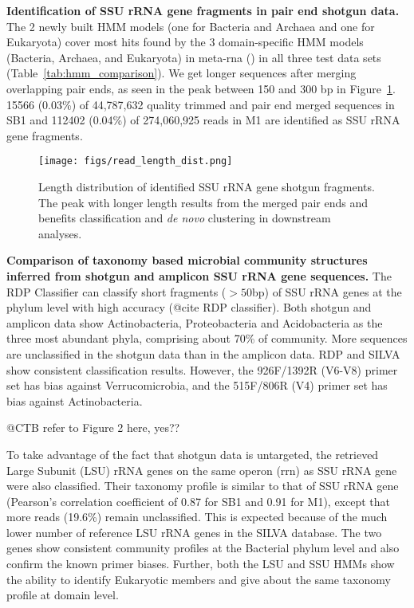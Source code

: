 \documentclass[12pt]{article}
\begin{document}
{\bf Identification of SSU rRNA gene fragments in pair end shotgun
data. } The 2 newly built HMM models (one for Bacteria and Archaea and
one for Eukaryota) cover most hits found by the 3 domain-specific HMM
models (Bacteria, Archaea, and Eukaryota) in meta-rna (\cite{metarna})
in all three test data sets (Table~\ref{tab:hmm_comparison}). We get
longer sequences after merging overlapping pair ends, as seen in the peak
between 150 and 300 bp in Figure~\ref{fig:read_length_dist}. 15566
(0.03\%) of 44,787,632 quality trimmed and pair end merged sequences
in SB1 and 112402 (0.04\%) of 274,060,925 reads in M1 are identified
as SSU rRNA gene fragments.

    \begin{figure}[tbph!]
    \centering
    \texttt{[image: figs/read\_length\_dist.png]}

    \caption[Length distribution of identified SSU rRNA gene shotgun
    fragments]{Length distribution of identified SSU rRNA gene shotgun
    fragments. The peak with longer length results from the merged
    pair ends and benefits classification and {\em de novo} clustering
    in downstream analyses.}

    \label{fig:read_length_dist}
    \end{figure}

{\bf Comparison of taxonomy based microbial community structures
inferred from shotgun and amplicon SSU rRNA gene sequences. } The RDP
Classifier can classify short fragments ($>50$bp) of SSU rRNA genes at
the phylum level with high accuracy (@cite RDP classifier). Both shotgun and
amplicon data show Actinobacteria, Proteobacteria and Acidobacteria as
the three most abundant phyla, comprising about 70\% of
community. More sequences are unclassified in the shotgun data than in
the amplicon data. RDP and SILVA show consistent classification
results. However, the 926F/1392R (V6-V8) primer set has bias against
Verrucomicrobia, and the 515F/806R (V4) primer set has bias against
Actinobacteria.

@CTB refer to Figure 2 here, yes??

To take advantage of the fact that shotgun data is untargeted, the
retrieved Large Subunit (LSU) rRNA genes on the same operon (rrn) as
SSU rRNA gene were also classified. Their taxonomy profile is similar
to that of SSU rRNA gene (Pearson's correlation coefficient of 0.87
for SB1 and 0.91 for M1), except that more reads (19.6\%) remain
unclassified. This is expected because of the much lower number of
reference LSU rRNA genes in the SILVA database. The two genes show
consistent community profiles at the Bacterial phylum level and also
confirm the known primer biases. Further, both the LSU and SSU HMMs
show the ability to identify Eukaryotic members and give about
the same taxonomy profile at domain level.
\end{document}
